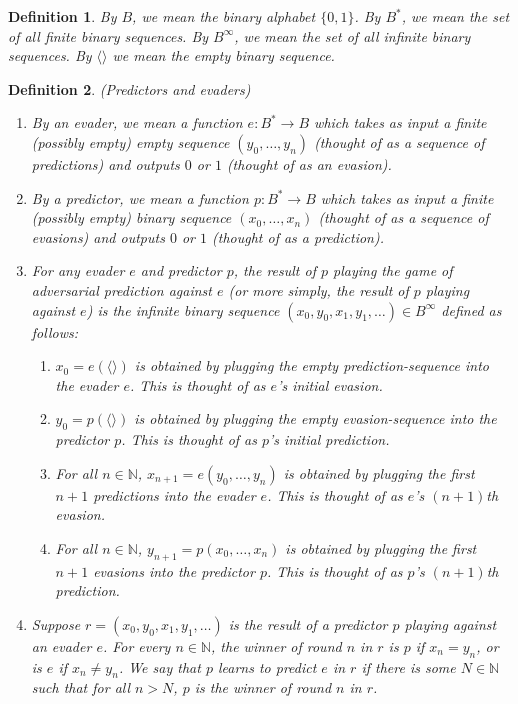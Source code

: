 \documentclass{article}
\newtheorem{definition}{Definition}
\begin{document}
\begin{definition}
By $B$, we mean the binary alphabet $\{0,1\}$. By $B^*$, we mean the set of all
finite binary sequences. By $B^\infty$, we mean the set of all infinite binary
sequences. By $\langle\rangle$ we mean the empty binary sequence.
\end{definition}

\begin{definition}
    (Predictors and evaders)
    \begin{enumerate}
        \item
        By an \emph{evader}, we mean a function $e:B^*\to B$
        which takes as input a finite (possibly empty) empty sequence $(y_0,\ldots,y_n)$
        (thought of as a sequence of \emph{predictions})
        and outputs $0$ or $1$ (thought of as an \emph{evasion}).
        \item
        By a \emph{predictor}, we mean a function $p:B^*\to B$
        which takes as input a finite (possibly empty) binary sequence $(x_0,\ldots,x_n)$
        (thought of as a sequence of \emph{evasions})
        and outputs $0$ or $1$ (thought of as a \emph{prediction}).
        \item
        For any evader $e$ and predictor $p$, the \emph{result of $p$ playing the
        game of adversarial prediction against $e$} (or more simply, the \emph{result of
        $p$ playing against $e$}) is the infinite binary sequence
        $(x_0,y_0,x_1,y_1,\ldots)\in B^\infty$
        defined as follows:
        \begin{enumerate}
            \item
            $x_0=e(\langle\rangle)$ is obtained by plugging the empty prediction-sequence into
            the evader $e$. This is thought of as $e$'s initial evasion.
            \item
            $y_0=p(\langle\rangle)$ is obtained by plugging the empty evasion-sequence into
            the predictor $p$. This is thought of as $p$'s initial prediction.
            \item
            For all $n\in\mathbb N$,
            $x_{n+1}=e(y_0,\ldots,y_n)$ is obtained by plugging the first $n+1$ predictions
            into the evader $e$. This is thought of as $e$'s $(n+1)$th evasion.
            \item
            For all $n\in\mathbb N$,
            $y_{n+1}=p(x_0,\ldots,x_n)$ is obtained by plugging the first $n+1$ evasions into
            the predictor $p$. This is thought of as $p$'s $(n+1)$th prediction.
        \end{enumerate}
        \item
        Suppose $r=(x_0,y_0,x_1,y_1,\ldots)$ is the result of a predictor $p$ playing
        against an evader $e$. For every $n\in\mathbb N$, the \emph{winner of round $n$ in $r$}
        is $p$ if $x_n=y_n$, or is $e$ if $x_n\neq y_n$.
        We say that \emph{$p$ learns to predict $e$ in $r$} if there is some $N\in\mathbb N$
        such that for all $n>N$, $p$ is the winner of round $n$ in $r$.
    \end{enumerate}
\end{definition}



\end{document}
